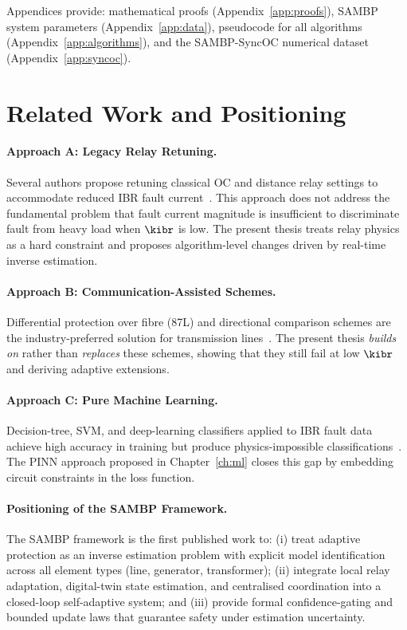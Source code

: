 Appendices provide: mathematical proofs (Appendix~\ref{app:proofs}),
SAMBP system parameters (Appendix~\ref{app:data}), pseudocode for all
algorithms (Appendix~\ref{app:algorithms}), and the SAMBP-SyncOC
numerical dataset (Appendix~\ref{app:syncoc}).

\section{Related Work and Positioning}
\label{sec:ch1_literature}

\paragraph{Approach A: Legacy Relay Retuning.}
Several authors propose retuning classical OC and distance relay settings
to accommodate reduced IBR fault current~\citep{Hooshyar2019, Sadeghi2021}.
This approach does not address the fundamental problem that fault current
magnitude is insufficient to discriminate fault from heavy load when $\kibr$
is low. The present thesis treats relay physics as a hard constraint
and proposes algorithm-level changes driven by real-time inverse estimation.

\paragraph{Approach B: Communication-Assisted Schemes.}
Differential protection over fibre (87L) and directional comparison schemes
are the industry-preferred solution for transmission lines~\citep{Gers2011, Zhang2020POTT}.
The present thesis \emph{builds on} rather than \emph{replaces} these schemes,
showing that they still fail at low $\kibr$ and deriving adaptive extensions.

\paragraph{Approach C: Pure Machine Learning.}
Decision-tree, SVM, and deep-learning classifiers applied to IBR fault data
achieve high accuracy in training but produce physics-impossible
classifications~\citep{Jamali2020, Liao2022DNN}. The PINN approach proposed
in Chapter~\ref{ch:ml} closes this gap by embedding circuit constraints in
the loss function.

\paragraph{Positioning of the SAMBP Framework.}
The SAMBP framework is the first published work to:
(i) treat adaptive protection as an inverse estimation problem with
explicit model identification across all element types (line, generator,
transformer);
(ii) integrate local relay adaptation, digital-twin state estimation, and
centralised coordination into a closed-loop self-adaptive system; and
(iii) provide formal confidence-gating and bounded update laws that
guarantee safety under estimation uncertainty.
